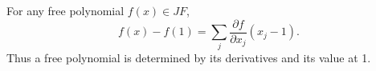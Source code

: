 For any free polynomial $f(x) \in JF$,
$$f(x) - f(1) = \sum_j \frac{\partial f}{\partial x_j} (x_j - 1).$$
Thus a free polynomial is determined by its derivatives and its value at 1.
